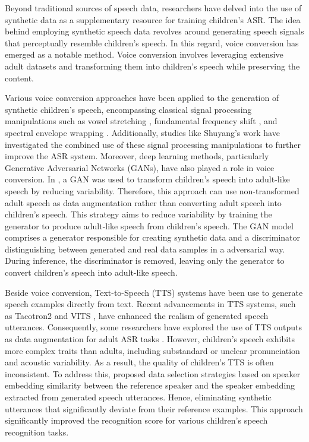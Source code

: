Beyond traditional sources of speech data, researchers have delved into the use of synthetic data as a supplementary resource for training children's ASR. The idea behind employing synthetic speech data revolves around generating speech signals that perceptually resemble children's speech. In this regard, voice conversion has emerged as a notable method. Voice conversion involves leveraging extensive adult datasets and transforming them into children's speech while preserving the content.

Various voice conversion approaches have been applied to the generation of synthetic children's speech, encompassing classical signal processing manipulations such as vowel stretching \cite{nagano2019data}, fundamental frequency shift \cite{yeung2021fundamental}, and spectral envelope wrapping \cite{dua2022spectral}. Additionally, studies like Shuyang's work \cite{shuyangdata} have investigated the combined use of these signal processing manipulations to further improve the ASR system. Moreover, deep learning methods, particularly Generative Adversarial Networks (GANs), have also played a role in voice conversion. In \cite{GANS}, a GAN was used to transform children's speech into adult-like speech by reducing variability. Therefore, this approach can use non-transformed adult speech as data augmentation rather than converting adult speech into children's speech. This strategy aims to reduce variability by training the generator to produce adult-like speech from children's speech. The GAN model comprises a generator responsible for creating synthetic data and a discriminator distinguishing between generated and real data samples in a adversarial way. During inference, the discriminator is removed, leaving only the generator to convert children's speech into adult-like speech.


Beside voice conversion, Text-to-Speech (TTS) systems have been use to generate speech examples directly from text. Recent advancements in TTS systems, such as Tacotron2 \cite{shen2018natural} and VITS \cite{kim2021conditional}, have enhanced the realism of generated speech utterances. Consequently, some researchers have explored the use of TTS outputs as data augmentation for adult ASR tasks \cite{laptev2020you}. However, children's speech exhibits more complex traits than adults, including substandard or unclear pronunciation and acoustic variability. As a result, the quality of children's TTS is often inconsistent. To address this, \cite{wang2021towards} proposed data selection strategies based on speaker embedding similarity between the reference speaker and the speaker embedding extracted from generated speech utterances. Hence, eliminating synthetic utterances that significantly deviate from their reference examples. This approach significantly improved the recognition score for various children's speech recognition tasks.

